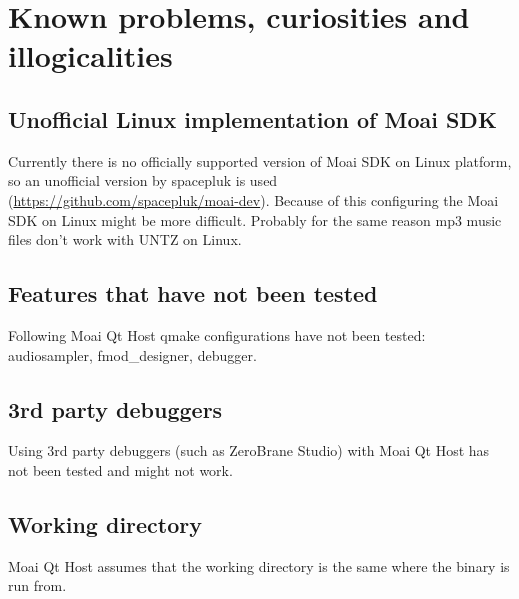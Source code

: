 \chapter{Known problems, curiosities and illogicalities}

\section{Unofficial Linux implementation of Moai SDK}

Currently there is no officially supported version of Moai SDK on Linux platform, so an unofficial version by spacepluk is used (\url{https://github.com/spacepluk/moai-dev}). 
Because of this configuring the Moai SDK on Linux might be more difficult.
Probably for the same reason mp3 music files don't work with UNTZ on Linux.

\section{Features that have not been tested}

Following Moai Qt Host qmake configurations have not been tested: audiosampler, fmod\_designer, debugger.

\section{3rd party debuggers}

Using 3rd party debuggers (such as ZeroBrane Studio) with Moai Qt Host has not been tested and might not work.

\section{Working directory}

Moai Qt Host assumes that the working directory is the same where the binary is run from.
